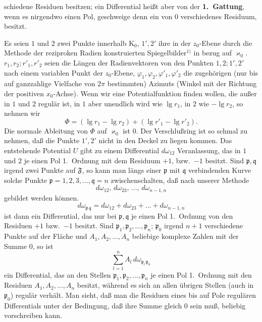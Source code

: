 \documentclass{article}
\begin{document}
schiedene Residuen besitzen; ein Differential heißt aber von der \textbf{1.\ Gattung}, wenn es nirgendwo einen Pol, geschweige denn ein von $0$ verschiedenes Residuum, besitzt.

Es seien $1$ und $2$ zwei Punkte innerhalb $\mathrm{K}_0$, $1', 2'$ ihre in der $z_0$-Ebene durch die Methode der reziproken Radien konstruierten Spiegelbilder${}^{1)}$ in bezug auf $\varkappa_0$. $r_1, r_2; r'_1, r'_2$ seien die Längen der Radienvektoren von den Punkten $1, 2; 1', 2'$ nach einem variablen Punkt der $z_0$-Ebene, $\varphi_1, \varphi_2, \varphi'_1, \varphi'_2$ die zugehörigen (nur bis auf ganzzahlige Vielfache von $2\pi$ bestimmten) Azimuts (Winkel mit der Richtung der positiven $x_0$-Achse). Wenn wir eine Potentialfunktion finden wollen, die außer in $1$ und $2$ regulär ist, in $1$ aber unendlich wird wie $\lg r_1$, in $2$ wie $-\lg r_2$, so nehmen wir
\[ \Phi = (\lg r_1 - \lg r_2) + (\lg r'_1 - \lg r'_2). \]
Die normale Ableitung von $\Phi$ auf $\varkappa_0$ ist $0$. Der Verschlußring ist so schmal zu nehmen, daß die Punkte $1', 2'$ nicht in den Deckel zu liegen kommen. Das entstehende Potential $U$ gibt zu einem Differential $d\omega_{12}$ Veranlassung, das in $1$ und $2$ je einen Pol 1.\ Ordnung mit dem Residuum $+ 1$, bzw.\ $- 1$ besitzt. Sind $\mathfrak{p}, \mathfrak{q}$ irgend zwei Punkte auf $\mathfrak{F}$, so kann man längs einer $\mathfrak{p}$ mit $\mathfrak{q}$ verbindenden Kurve solche Punkte $\mathfrak{p} = 1, 2, 3, \dots, \mathfrak{q} = n$ zwischenschalten, daß nach unserer Methode
\[ d\omega_{12}, \, d\omega_{23}, \, \dots, \, d\omega_{n-1, n} \]
gebildet werden können.
\[ d\omega_{\mathfrak{p}\,\mathfrak{q}} = d\omega_{12} + d\omega_{23} + \dots + d\omega_{n-1, n} \]
ist dann ein Differential, das nur bei $\mathfrak{p}, \mathfrak{q}$ je einen Pol 1.\ Ordnung von den Residuen $+ 1$ bzw.\ $- 1$ besitzt. Sind $\mathfrak{p}_1, \mathfrak{p}_2, \dots, \mathfrak{p}_n$; $\mathfrak{p}_0$ irgend $n + 1$ verschiedene Punkte auf der Fläche und $A_1, A_2, \dots, A_n$ beliebige komplexe Zahlen mit der Summe $0$, so ist
\[ \sum_{l=1}^n A_l\,d\omega_{\mathfrak{p}_l\,\mathfrak{p}_0} \]
ein Differential, das an den Stellen $\mathfrak{p}_1, \mathfrak{p}_2, \dots, \mathfrak{p}_n$ je einen Pol 1.\ Ordnung mit den Residuen $A_1, A_2, \dots, A_n$ besitzt, während es sich an allen übrigen Stellen (auch in $\mathfrak{p}_0$) regulär verhält. Man sieht, daß man die Residuen eines bis auf Pole regulären Differentials unter der Bedingung, daß ihre Summe gleich $0$ sein muß, beliebig vorschreiben kann.
\end{document}
